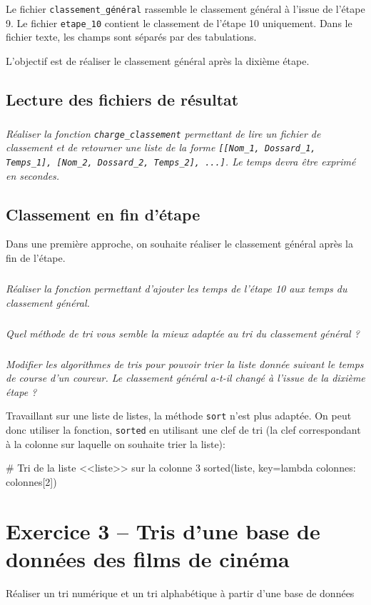 Le fichier \texttt{classement\_général} rassemble le classement général à l'issue de l'étape 9. Le fichier \texttt{etape\_10} contient le classement de l'étape 10 uniquement. Dans le fichier texte, les champs sont séparés par des tabulations.


\begin{obj}
L'objectif est de réaliser le classement général après la dixième étape. 
\end{obj}

\subsection*{Lecture des fichiers de résultat}
\setcounter{exo}{0}
\subparagraph{}
\textit{Réaliser la fonction \texttt{charge\_classement} permettant de lire un fichier de classement 
et de retourner une liste de la forme \texttt{[[Nom\_1, Dossard\_1, Temps\_1], [Nom\_2, Dossard\_2, Temps\_2], ...]}. Le temps devra être exprimé en secondes.}



\subsection*{Classement en fin d'étape}
Dans une première approche, on souhaite réaliser le classement général après la fin de l'étape. 

\subparagraph{}
\textit{Réaliser la fonction permettant d'ajouter les temps de l'étape 10 aux temps du classement général.}

\subparagraph{}
\textit{Quel méthode de tri vous semble la mieux adaptée au tri du classement général ?}

\subparagraph{}
\textit{Modifier les algorithmes de tris pour pouvoir trier la liste donnée suivant le temps de course d'un coureur. Le classement général a-t-il changé à l'issue de la dixième étape ?}

\begin{rem}
Travaillant sur une liste de listes, la méthode \texttt{sort} n'est plus adaptée. On peut donc utiliser la fonction, \texttt{sorted} en utilisant une clef de tri (la clef correspondant à la colonne sur laquelle on souhaite trier la liste): 
\end{rem}
\begin{python}
# Tri de la liste <<liste>> sur la colonne 3
sorted(liste, key=lambda colonnes: colonnes[2])
\end{python}


\section*{Exercice 3 -- Tris d'une base de données des films de cinéma}
\setcounter{exo}{0}
\begin{obj}
Réaliser un tri numérique et un tri alphabétique à partir d'une base de données
\end{obj}

